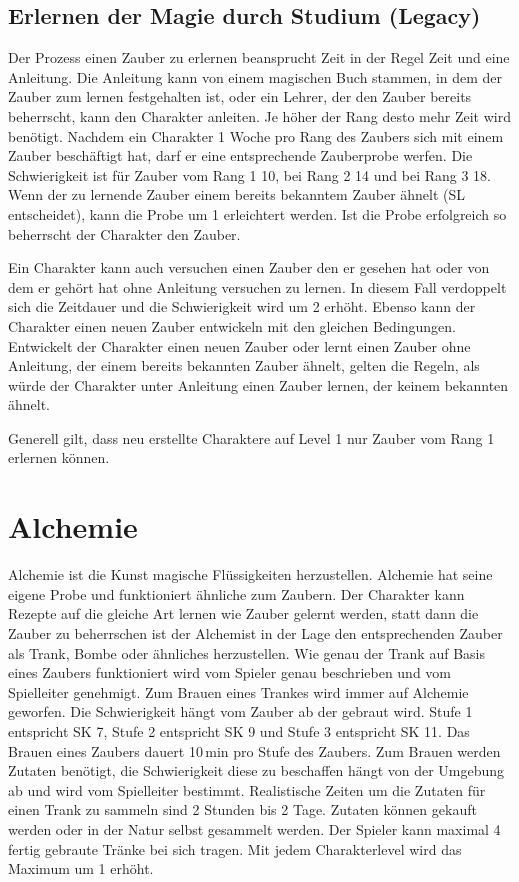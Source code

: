 \documentclass[../../Heldenanleitung2]{subfiles}
\begin{document}
\subsection{Erlernen der Magie durch Studium (Legacy)}
Der Prozess einen Zauber zu erlernen beansprucht Zeit in der Regel Zeit und eine Anleitung. Die Anleitung kann von einem magischen Buch stammen, in dem der Zauber zum lernen festgehalten ist, oder ein Lehrer, der den Zauber bereits beherrscht, kann den Charakter anleiten. Je höher der Rang desto mehr Zeit wird benötigt. Nachdem ein Charakter 1 Woche pro Rang des Zaubers sich mit einem Zauber beschäftigt hat, darf er eine entsprechende Zauberprobe werfen. Die Schwierigkeit ist für Zauber vom Rang 1 10, bei Rang 2 14 und bei Rang 3 18. Wenn der zu lernende Zauber einem bereits bekanntem Zauber ähnelt (SL entscheidet), kann die Probe um 1 erleichtert werden. Ist die Probe erfolgreich so beherrscht der Charakter den Zauber.

Ein Charakter kann auch versuchen einen Zauber den er gesehen hat oder von dem er gehört hat ohne Anleitung versuchen zu lernen. In diesem Fall verdoppelt sich die Zeitdauer und die Schwierigkeit wird um 2 erhöht. Ebenso kann der Charakter einen neuen Zauber entwickeln mit den gleichen Bedingungen. Entwickelt der Charakter einen neuen Zauber oder lernt einen Zauber ohne Anleitung, der einem bereits bekannten Zauber ähnelt, gelten die Regeln, als würde der Charakter unter Anleitung einen Zauber lernen, der keinem bekannten ähnelt.

Generell gilt, dass neu erstellte Charaktere auf Level 1 nur Zauber vom Rang 1 erlernen können.

\section{Alchemie}
Alchemie ist die Kunst magische Flüssigkeiten herzustellen. Alchemie hat seine eigene Probe und funktioniert ähnliche zum Zaubern. Der Charakter kann Rezepte auf die gleiche Art lernen wie Zauber gelernt werden, statt dann die Zauber zu beherrschen ist der Alchemist in der Lage den entsprechenden Zauber als Trank, Bombe oder ähnliches herzustellen. Wie genau der Trank auf Basis eines Zaubers funktioniert wird vom Spieler genau beschrieben und vom Spielleiter genehmigt. Zum Brauen eines Trankes wird immer auf Alchemie geworfen. Die Schwierigkeit hängt vom Zauber ab der gebraut wird. Stufe 1 entspricht SK 7, Stufe 2 entspricht SK 9 und Stufe 3 entspricht SK 11. Das Brauen eines Zaubers dauert 10\,min pro Stufe des Zaubers. Zum Brauen werden Zutaten benötigt, die Schwierigkeit diese zu beschaffen hängt von der Umgebung ab und wird vom Spielleiter bestimmt. Realistische Zeiten um die Zutaten für einen Trank zu sammeln sind 2 Stunden bis 2 Tage. Zutaten können gekauft werden oder in der Natur selbst gesammelt werden. Der Spieler kann maximal 4 fertig gebraute Tränke bei sich tragen. Mit jedem Charakterlevel wird das Maximum um 1 erhöht.
\end{document}
